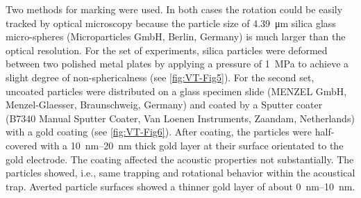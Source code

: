 Two methods for marking were used. In both cases the rotation could be easily 
tracked by optical microscopy because the particle size of 
\SI{4.39}{\micro\meter} silica glass micro-spheres (Microparticles
GmbH, Berlin, Germany) is much larger than the optical resolution.
For the set of experiments, silica particles were deformed between two polished 
metal plates by applying a pressure of \SI{1}{\mega\pascal} to achieve a slight 
degree of non-sphericalness (see \cref{fig:VT-Fig5}). For the second set, uncoated 
particles were distributed on a glass specimen slide (MENZEL GmbH, 
Menzel-Glaesser, Braunschweig, Germany) and coated by a Sputter coater (B7340 
Manual Sputter Coater, Van Loenen Instruments, Zaandam, Netherlands) with a gold 
coating (see \cref{fig:VT-Fig6}). After coating, the particles were half-covered 
with a \SIrange{10}{20}{\nano\meter} thick gold layer at their surface 
orientated to the gold electrode. The coating affected the acoustic properties 
not substantially. The particles showed, i.e., same trapping and rotational 
behavior within the acoustical trap. Averted particle surfaces showed a thinner 
gold layer of about \SIrange{0}{10}{\nano\meter}.
